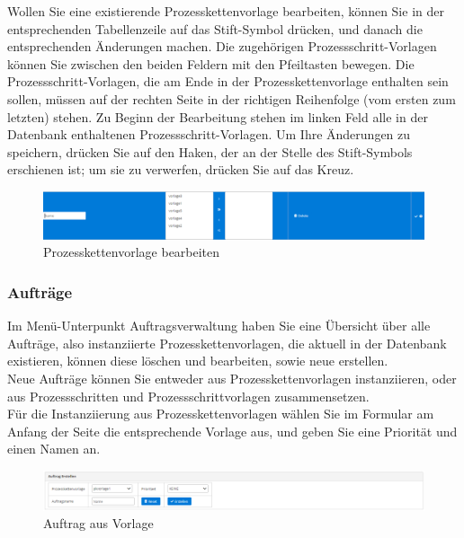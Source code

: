 \documentclass[enabledeprecatedfontcommands,fontsize=12pt,paper=a4,twoside]{scrartcl}
\begin{document}
Wollen Sie eine existierende Prozesskettenvorlage bearbeiten, können Sie in der entsprechenden Tabellenzeile auf das Stift-Symbol drücken, und danach die entsprechenden Änderungen machen. Die zugehörigen Prozessschritt-Vorlagen können Sie zwischen den beiden Feldern mit den Pfeiltasten bewegen. Die Prozessschritt-Vorlagen, die am Ende in der Prozesskettenvorlage enthalten sein sollen, müssen auf der rechten Seite in der richtigen Reihenfolge (vom ersten zum letzten) stehen. Zu Beginn der Bearbeitung stehen im linken Feld alle in der Datenbank enthaltenen Prozessschritt-Vorlagen. Um Ihre Änderungen zu speichern, drücken Sie auf den Haken, der an der Stelle des Stift-Symbols erschienen ist; um sie zu verwerfen, drücken Sie auf das Kreuz. \\

\begin{figure}[h!]
\begin{center}
 \includegraphics[width=\textwidth]{screenshots/pk/prozesskettenvorlageedit.png}
  \caption{Prozesskettenvorlage bearbeiten}
  \label{fig:boat2}
\end{center}
\end{figure}

\subsubsection{Aufträge}

Im Menü-Unterpunkt Auftragsverwaltung haben Sie eine Übersicht über alle Aufträge, also instanziierte Prozesskettenvorlagen, die aktuell in der Datenbank existieren, können diese löschen und bearbeiten, sowie neue erstellen. \\

Neue Aufträge können Sie entweder aus Prozesskettenvorlagen instanziieren, oder aus Prozessschritten und Prozessschrittvorlagen zusammensetzen. \\

Für die Instanziierung aus Prozesskettenvorlagen wählen Sie im Formular am Anfang der Seite die entsprechende Vorlage aus, und geben Sie eine Priorität und einen Namen an. \\

\begin{figure}[h!]
\begin{center}
 \includegraphics[width=\textwidth]{screenshots/pk/auftragformular.png}
  \caption{Auftrag aus Vorlage}
  \label{fig:boat2}
\end{center}
\end{figure}
\end{document}
